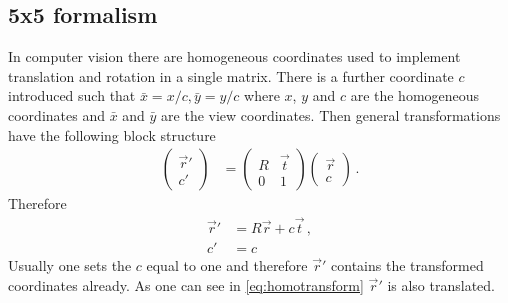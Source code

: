 \documentclass[12pt,a4paper,twoside,openright,BCOR10mm,headsepline,titlepage,abstracton,chapterprefix,final]{scrreprt}
\begin{document}
\subsection{5x5 formalism}
In computer vision there are homogeneous coordinates used to implement translation and rotation in a single matrix.
There is a further coordinate $c$ introduced such that $\bar{x} = x/c, \bar{y} = y/c$ where $x$, $y$ and $c$
are the homogeneous coordinates and $\bar{x}$ and $\bar{y}$ are the view coordinates. Then general transformations have the following block
structure
\begin{align}
 \begin{pmatrix} \vec{r}' \\ c' \end{pmatrix} &= 
 \begin{pmatrix}
  R & \vec{t} \\
  0 & 1
 \end{pmatrix}
 \begin{pmatrix}
  \vec{r} \\ 
  c
 \end{pmatrix}\,.
\end{align}
Therefore
\begin{align}
 \vec{r}' &= R \vec{r} + c \vec{t}\,,\label{eq:homotransform}\\
 c' &= c
\end{align}
Usually one sets the $c$ equal to one and therefore $\vec{r}'$ contains
the transformed coordinates already. As one can see in \eqref{eq:homotransform}
$\vec{r}'$ is also translated.
\end{document}
